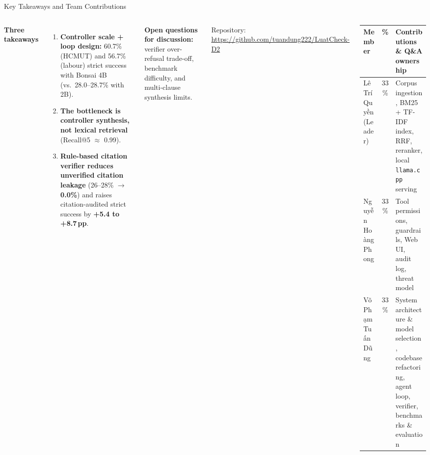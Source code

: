 \documentclass[aspectratio=1610,11pt]{beamer}
\newcommand{\pp}{\,pp\xspace}
\renewcommand{\arraystretch}{1.15}
\begin{document}
\begin{frame}{Key Takeaways and Team Contributions}
  \begin{columns}[T]
    \footnotesize
    \textbf{Three takeaways}
    \begin{enumerate}
      \item \textbf{Controller scale + loop design:} 60.7\% (HCMUT) and 56.7\% (labour) strict success with Bonsai 4B (vs.\ 28.0--28.7\% with 2B).
      \item \textbf{The bottleneck is controller synthesis, not lexical retrieval} (Recall@5 $\approx$ 0.99).
      \item \textbf{Rule-based citation verifier reduces unverified citation leakage} (26--28\% $\to$ \textbf{0.0\%}) and raises citation-audited strict success by \textbf{+5.4 to +8.7\pp}.
    \end{enumerate}
    \textbf{Open questions for discussion:} verifier over-refusal trade-off, benchmark difficulty, and multi-clause synthesis limits.
    \vspace{4pt}

    {\scriptsize Repository: \url{https://github.com/tuandung222/LuatCheck-D2}}

    \scriptsize\renewcommand{\arraystretch}{1.2}
    \begin{tabularx}{\linewidth}{@{}>{\raggedright\arraybackslash}p{2.25cm}c>{\raggedright\arraybackslash}X@{}}
      \toprule Member & \% & Contributions \& Q\&A ownership\\\midrule
      Lê Trí Quyền (Leader) & 33\% & Corpus ingestion, BM25 + TF-IDF index, RRF, reranker, local \texttt{llama.cpp} serving\\
      Nguyễn Hoàng Phong & 33\% & Tool permissions, guardrails, Web UI, audit log, threat model\\
      Võ Phạm Tuấn Dũng & 33\% & System architecture \& model selection, codebase refactoring, agent loop, verifier, benchmarks \& evaluation\\
      \bottomrule
    \end{tabularx}
  \end{columns}
\end{frame}
\end{document}
